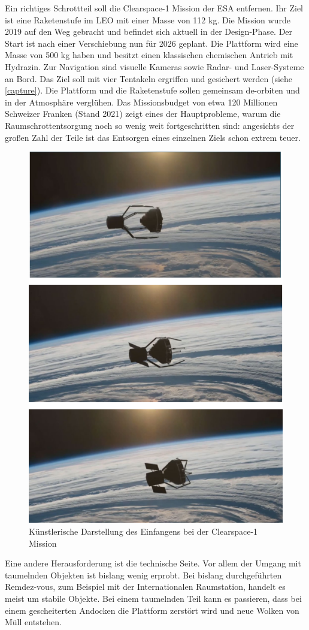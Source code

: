 \documentclass{article}
\begin{document}
\noindent Ein richtiges Schrottteil soll die Clearspace-1 Mission der ESA entfernen. Ihr Ziel ist eine Raketenstufe im LEO mit einer Masse von 112 kg. Die Mission wurde 2019 auf den Weg gebracht und befindet sich aktuell in der Design-Phase. Der Start ist nach einer Verschiebung nun für 2026 geplant. Die Plattform wird eine Masse von 500 kg haben und besitzt einen klassischen chemischen Antrieb mit Hydrazin. Zur Navigation sind visuelle Kameras sowie Radar- und Laser-Systeme an Bord. Das Ziel soll mit vier Tentakeln ergriffen und gesichert werden (siehe \autoref{capture}). Die Plattform und die Raketenstufe sollen gemeinsam de-orbiten und in der Atmosphäre verglühen. Das Missionsbudget von etwa 120 Millionen Schweizer Franken (Stand 2021) zeigt eines der Hauptprobleme, warum die Raumschrottentsorgung noch so wenig weit fortgeschritten sind: angesichts der großen Zahl der Teile ist das Entsorgen eines einzelnen Ziels schon extrem teuer.
\begin{figure}[H]
	\centering
	\includegraphics[width=0.55\linewidth]{bilder/ClearspaceCapture.png}
	\caption{Künstlerische Darstellung des Einfangens bei der Clearspace-1 Mission \citep{biesbroek2021clearspace}}
	\label{capture}
\end{figure}
\noindent Eine andere Herausforderung ist die technische Seite. Vor allem der Umgang mit taumelnden Objekten ist bislang wenig erprobt. Bei bislang durchgeführten Remdez-vous, zum Beispiel mit der Internationalen Raumstation, handelt es meist um stabile Objekte. Bei einem taumelnden Teil kann es passieren, dass bei einem gescheiterten Andocken die Plattform zerstört wird und neue Wolken von Müll entstehen. \\\\
\end{document}
